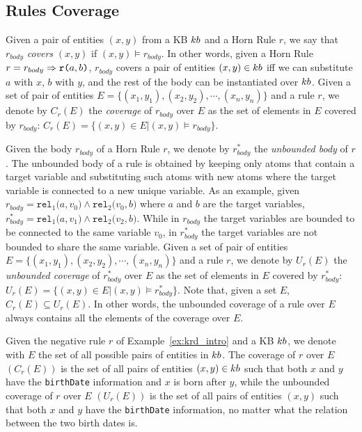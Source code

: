\subsection{Rules Coverage}
Given a pair of entities $(x,y)$ from a KB ${\sc kb}$ and a Horn Rule $r$, we say that $r_{body}$ \emph{covers} $(x,y)$ if
$(x,y) \models r_{body}$. In other words, given a Horn Rule $r = r_{body} \Rightarrow \texttt{r(}a,b\texttt{)}$, $r_{body}$ covers a pair of entities $(x,y) \in {\sc kb}$ iff we can substitute $a$ with $x$, $b$ with $y$, and the rest of the body can be instantiated over ${\sc kb}$. Given a set of pair of entities $E = \{(x_1,y_1),(x_2,y_2),\cdots,(x_n,y_n)\}$ and a rule $r$, we denote by $C_r(E)$ the \emph{coverage} of $r_{body}$ over $E$ as the set of elements in $E$ covered by $r_{body}$: $C_r(E)=\{(x,y) \in E | (x,y) \models r_{body}\}$.

Given the body $r_{body}$ of a Horn Rule $r$, we denote by $r^{*}_{body}$ the \emph{unbounded body} of $r$. The unbounded body of a rule is obtained by keeping only atoms that contain a target variable and substituting such atoms with new atoms where the target variable is connected to a new unique variable. As an example, given $r_{body} = \texttt{rel}_1\texttt{(}a,v_0\texttt{)} \wedge \texttt{rel}_2\texttt{(}v_0,b\texttt{)}$ where $a$ and $b$ are the target variables, $r^{*}_{body} = \texttt{rel}_1\texttt{(}a,v_1\texttt{)} \wedge \texttt{rel}_2\texttt{(}v_2,b\texttt{)}$.
While in $r_{body}$ the target variables are bounded to be connected to the same variable $v_0$, in $r^{*}_{body}$ the target variables are not bounded to share the same variable.
Given a set of pair of entities $E = \{(x_1,y_1),(x_2,y_2),\cdots,(x_n,y_n)\}$ and a rule $r$, we denote by $U_r(E)$ the \emph{unbounded coverage} of $r^{*}_{body}$ over $E$ as the set of elements in $E$ covered by $r^{*}_{body}$: $U_r(E)=\{(x,y) \in E | (x,y) \models r^{*}_{body}\}$. Note that, given a set $E$, $C_r(E) \subseteq U_r(E)$. In other words, the unbounded coverage of a rule over $E$ always contains all the elements of the coverage over $E$.

\begin{example}
	Given the negative rule $r$ of Example~\ref{ex:krd_intro} and a KB ${\sc kb}$, we denote with $E$ the set of all possible pairs of entities in ${\sc kb}$. The coverage of $r$ over $E$ $(C_r(E))$ is the set of all pairs of entities $(x,y) \in {\sc kb}$ such that both $x$ and $y$ have the \texttt{birthDate} information and $x$ is born after $y$, while the unbounded coverage of $r$ over $E$ $(U_r(E))$ is the set of all pairs of entities $(x,y)$ such that both $x$ and $y$ have the \texttt{birthDate} information, no matter what the relation between the two birth dates is. 
\end{example} 

